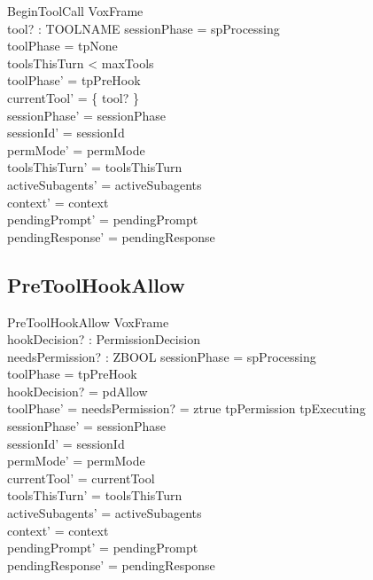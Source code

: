 \documentclass[a4paper,10pt,fleqn]{article}
\begin{document}
\begin{schema}{BeginToolCall}
  VoxFrame \\
  tool? : TOOLNAME
  \where
  sessionPhase = spProcessing \\
  toolPhase = tpNone \\
  toolsThisTurn < maxTools \\
  toolPhase' = tpPreHook \\
  currentTool' = \{ tool? \} \\
  sessionPhase' = sessionPhase \\
  sessionId' = sessionId \\
  permMode' = permMode \\
  toolsThisTurn' = toolsThisTurn \\
  activeSubagents' = activeSubagents \\
  context' = context \\
  pendingPrompt' = pendingPrompt \\
  pendingResponse' = pendingResponse
\end{schema}

\subsection{PreToolHookAllow}

\begin{schema}{PreToolHookAllow}
  VoxFrame \\
  hookDecision? : PermissionDecision \\
  needsPermission? : ZBOOL
  \where
  sessionPhase = spProcessing \\
  toolPhase = tpPreHook \\
  hookDecision? = pdAllow \\
  toolPhase' = \IF needsPermission? = ztrue \THEN tpPermission \ELSE tpExecuting \\
  sessionPhase' = sessionPhase \\
  sessionId' = sessionId \\
  permMode' = permMode \\
  currentTool' = currentTool \\
  toolsThisTurn' = toolsThisTurn \\
  activeSubagents' = activeSubagents \\
  context' = context \\
  pendingPrompt' = pendingPrompt \\
  pendingResponse' = pendingResponse
\end{schema}
\end{document}
